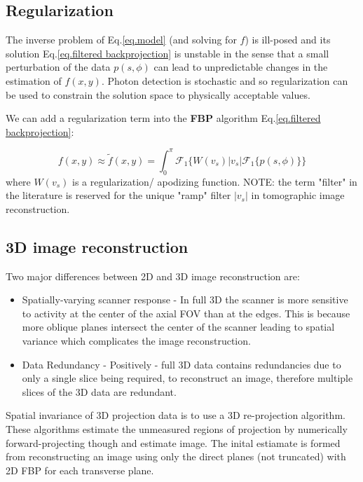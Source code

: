 \documentclass{article}
\begin{document}
\subsection{Regularization}
The inverse problem of Eq.\ref{eq.model} (and solving for $f$) is ill-posed and its solution Eq.\ref{eq.filtered backprojection} is unstable in the sense that a small perturbation of the data $p(s,\phi)$ can lead to unpredictable changes in the estimation of $f(x,y)$. Photon detection is stochastic and so regularization can be used to constrain the solution space to physically acceptable values.

We can add a regularization term into the \textbf{FBP} algorithm Eq.\ref{eq.filtered backprojection}:

\begin{equation} \label{eq.apodizing}
	f(x,y) \approx\tilde{f}(x,y) = \int_0^\pi \mathcal{F}_1 \big \{W(v_s) |v_s| \mathcal{F}_1 \{p(s,\phi)\}\big\}
\end{equation}
where $W(v_s)$ is a regularization/ apodizing function.
NOTE: the term "filter" in the literature is reserved for the unique "ramp" filter $|v_s|$ in tomographic image reconstruction.

\subsection{3D image reconstruction}

Two major differences between 2D and 3D image reconstruction are: 
\begin{itemize}
\item Spatially-varying scanner response - In full 3D the scanner is more sensitive to activity at the center of the axial FOV than at the edges. This is because more oblique planes intersect the center of the scanner leading to spatial variance which complicates the image reconstruction.
\item Data Redundancy - Positively - full 3D data contains redundancies due to only a single slice being required, to reconstruct an image, therefore multiple slices of the 3D data are redundant.
\end{itemize}

Spatial invariance of 3D projection data is to use a 3D re-projection algorithm. These algorithms estimate the unmeasured regions of projection by numerically forward-projecting though and estimate image. The inital estiamate is formed from reconstructing an image using only the direct planes (not truncated) with 2D FBP for each transverse plane.
\end{document}
